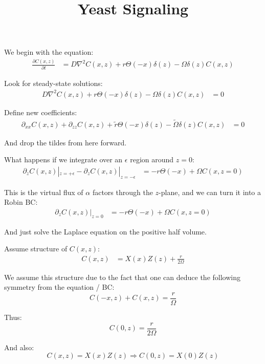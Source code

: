 \documentclass{article}
\title{\textbf{Yeast Signaling}}
\date{}
\begin{document}
\maketitle

We begin with the equation:
\begin{align}
\frac{\partial C(x,z)}{\partial t} &= D \nabla^{2} C(x,z) + r \Theta(-x) \delta(z) - \Omega \delta(z) C(x,z)
\end{align}

Look for steady-state solutions:
\begin{align}
D \nabla^{2} C(x,z) + r \Theta(-x) \delta(z) - \Omega \delta(z) C(x,z) &= 0
\end{align}

Define new coefficients:
\begin{align}
\partial_{xx} C(x,z) + \partial_{zz} C(x,z) + \tilde{r} \Theta(-x) \delta(z) - \tilde{\Omega} \delta(z) C(x,z) &= 0
\end{align}

And drop the tildes from here forward.

What happens if we integrate over an $\epsilon$ region around $z=0$:
\begin{align}
\partial_{z} C(x,z)|_{z=+\epsilon} - \partial_{z} C(x,z)|_{z=-\epsilon} &= -r \Theta(-x) + \Omega C(x,z=0)
\end{align}

This is the virtual flux of $\alpha$ factors through the $z$-plane, and we can turn it into a Robin BC:
\begin{align*}
\partial_{z} C(x,z)|_{z=0} &= -r \Theta(-x) + \Omega C(x,z=0)
\end{align*}

And just solve the Laplace equation on the positive half volume.

Assume structure of $C(x,z)$:
\begin{align}
C(x,z) &= X(x) Z(z) + \frac{r}{2 \Omega}
\end{align}

We assume this structure due to the fact that one can deduce the following symmetry from the equation / BC:
\begin{equation}
C(-x,z) + C(x,z) = \frac{r}{\Omega}
\end{equation}

Thus:
\begin{equation}
C(0,z) = \frac{r}{2 \Omega}
\end{equation}

And also:
\begin{equation}
C(x,z) = X(x) Z(z) \Rightarrow C(0,z) = X(0) Z(z)
\end{equation}
\end{document}
